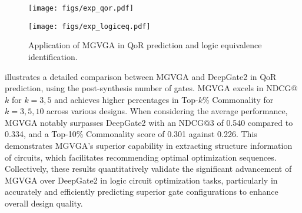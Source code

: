 
\begin{figure}[]
\centering
\begin{minipage}[t]{0.32\linewidth}
\centering
\texttt{[image: figs/exp\_qor.pdf]}
\end{minipage}
\hspace{20pt}
\begin{minipage}[t]{0.32\linewidth}
\centering
\texttt{[image: figs/exp\_logiceq.pdf]}
\end{minipage}
\caption{Application of MGVGA in QoR prediction and logic equivalence identification.}
\label{fig:downstream}
\end{figure}

 illustrates a detailed comparison between MGVGA and DeepGate2 in QoR prediction, using the post-synthesis number of gates.
MGVGA excels in NDCG@$k$ for $k=3, 5$ and achieves higher percentages in Top-$k$\% Commonality for $k=3, 5, 10$ across various designs.
When considering the average performance, MGVGA notably surpasses DeepGate2 with an NDCG@3 of 0.540 compared to 0.334, and a Top-10\% Commonality score of 0.301 against 0.226. 
This demonstrates MGVGA’s superior capability in extracting structure information of circuits, which facilitates recommending optimal optimization sequences.
Collectively, these results quantitatively validate the significant advancement of MGVGA over DeepGate2 in logic circuit optimization tasks, particularly in accurately and efficiently predicting superior gate configurations to enhance overall design quality.


